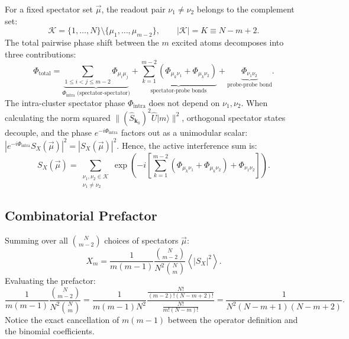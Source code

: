 \documentclass[11pt,a4paper]{article}
\begin{document}
For a fixed spectator set $\vec{\mu}$, the readout pair $\nu_1 \ne \nu_2$ belongs to the complement set:
\begin{equation}
    \mathcal{K} = \{1, \dots, N\} \setminus \{\mu_1, \dots, \mu_{m-2}\}, \qquad |\mathcal{K}| = K \equiv N - m + 2.
\end{equation}
The total pairwise phase shift between the $m$ excited atoms decomposes into three contributions:
\begin{equation}
    \Phi_{\text{total}} = \underbrace{\sum_{1 \le i < j \le m-2} \Phi_{\mu_i \mu_j}}_{\Phi_{\text{intra}} \text{ (spectator-spectator)}} + \underbrace{\sum_{k=1}^{m-2} (\Phi_{\mu_k \nu_1} + \Phi_{\mu_k \nu_2})}_{\text{spectator-probe bonds}} + \underbrace{\Phi_{\nu_1 \nu_2}}_{\text{probe-probe bond}}.
\end{equation}
The intra-cluster spectator phase $\Phi_{\text{intra}}$ does not depend on $\nu_1, \nu_2$. When calculating the norm squared $\|(\hat{S}_{\mathbf{k}_0})^2 \hat{U}|m\rangle\|^2$, orthogonal spectator states decouple, and the phase $e^{-i \Phi_{\text{intra}}}$ factors out as a unimodular scalar: $|e^{-i \Phi_{\text{intra}}} S_X(\vec{\mu})|^2 = |S_X(\vec{\mu})|^2$.
Hence, the active interference sum is:
\begin{equation}
    S_X(\vec{\mu}) = \sum_{\substack{\nu_1, \nu_2 \in \mathcal{K} \\ \nu_1 \ne \nu_2}} \exp\left( -i \left[ \sum_{k=1}^{m-2} (\Phi_{\mu_k \nu_1} + \Phi_{\mu_k \nu_2}) + \Phi_{\nu_1 \nu_2} \right] \right).
    \label{eq:SX_def}
\end{equation}

\subsection{Combinatorial Prefactor}
Summing over all $\binom{N}{m-2}$ choices of spectators $\vec{\mu}$:
\begin{equation}
    X_m = \frac{1}{m(m - 1)} \frac{\binom{N}{m-2}}{N^2 \binom{N}{m}} \left\langle |S_X|^2 \right\rangle.
\end{equation}
Evaluating the prefactor:
\begin{equation}
    \frac{1}{m(m - 1)} \frac{\binom{N}{m-2}}{N^2 \binom{N}{m}} = \frac{1}{m(m - 1) N^2} \frac{\frac{N!}{(m-2)!(N-m+2)!}}{\frac{N!}{m!(N-m)!}} = \frac{1}{N^2 (N - m + 1)(N - m + 2)}.
    \label{eq:comb_prefactor_X}
\end{equation}
Notice the exact cancellation of $m(m - 1)$ between the operator definition and the binomial coefficients.
\end{document}
